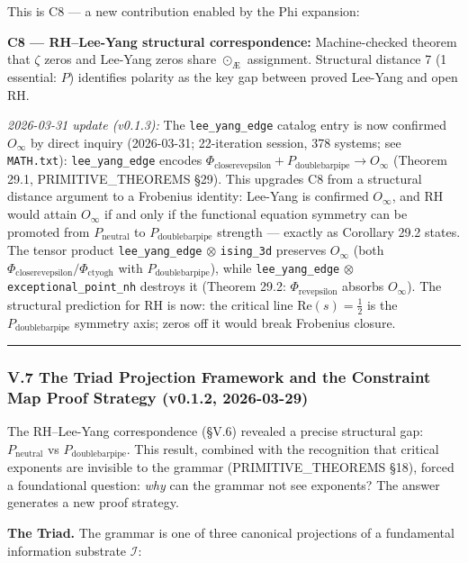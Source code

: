 \documentclass[12pt,a4paper]{article}
\newcommand{\pilcrow}{\S}
\begin{document}
This is C8 --- a new contribution enabled by the Phi expansion:

\textbf{C8 --- RH--Lee-Yang structural correspondence:} Machine-checked theorem that $\zeta$ zeros and Lee-Yang zeros share $\odot_{\text{Æ}}$ assignment. Structural distance 7 (1 essential: $P$) identifies polarity as the key gap between proved Lee-Yang and open RH.

\emph{2026-03-31 update (v0.1.3):} The \texttt{lee\_yang\_edge} catalog entry is now confirmed $O_{\infty}$ by direct inquiry (2026-03-31; 22-iteration session, 378 systems; see \texttt{MATH.txt}): \texttt{lee\_yang\_edge} encodes $\Phi_{\text{closerevepsilon}} + P_{\text{doublebarpipe}} \to O_{\infty}$ (Theorem 29.1, PRIMITIVE\_THEOREMS \pilcrow{}29). This upgrades C8 from a structural distance argument to a Frobenius identity: Lee-Yang is confirmed $O_{\infty}$, and RH would attain $O_{\infty}$ if and only if the functional equation symmetry can be promoted from $P_\text{neutral}$ to $P_{\text{doublebarpipe}}$ strength --- exactly as Corollary 29.2 states. The tensor product \texttt{lee\_yang\_edge} $\otimes$ \texttt{ising\_3d} preserves $O_{\infty}$ (both $\Phi_{\text{closerevepsilon}}/\Phi_{\text{ctyogh}}$ with $P_{\text{doublebarpipe}}$), while \texttt{lee\_yang\_edge} $\otimes$ \texttt{exceptional\_point\_nh} destroys it (Theorem 29.2: $\Phi_{\text{revepsilon}}$ absorbs $O_{\infty}$). The structural prediction for RH is now: the critical line $\mathrm{Re}(s) = \tfrac{1}{2}$ is the $P_{\text{doublebarpipe}}$ symmetry axis; zeros off it would break Frobenius closure.

\begin{center}
\rule{0.5\textwidth}{0.4pt}
\end{center}

\subsubsection{V.7 The Triad Projection Framework and the Constraint Map Proof Strategy (v0.1.2, 2026-03-29)}

The RH--Lee-Yang correspondence (\pilcrow{}V.6) revealed a precise structural gap: $P_\text{neutral}$ vs $P_{\text{doublebarpipe}}$. This result, combined with the recognition that critical exponents are invisible to the grammar (PRIMITIVE\_THEOREMS \pilcrow{}18), forced a foundational question: \emph{why} can the grammar not see exponents? The answer generates a new proof strategy.

\textbf{The Triad.} The grammar is one of three canonical projections of a fundamental information substrate $\mathcal{I}$:
\end{document}
